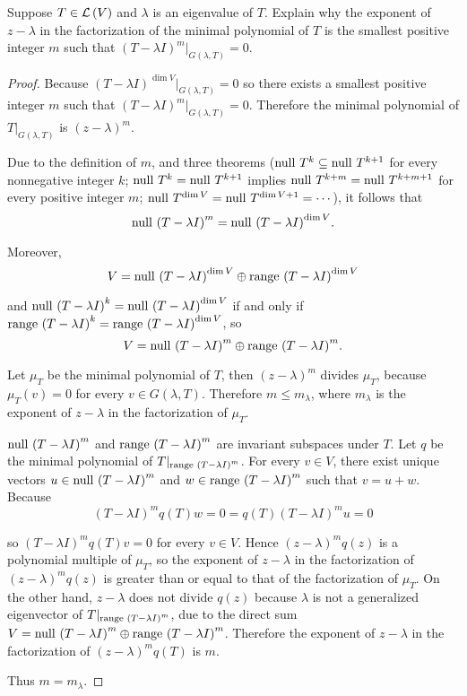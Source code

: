 \begin{exercise}\label{chapter8:sectionB:exercise6}
    Suppose $T \in \mathcal{L}\left({V}\right)$ and $\lambda$ is an eigenvalue of $T$. Explain why the exponent of $z - \lambda$ in the factorization of the minimal polynomial of $T$ is the smallest positive integer $m$ such that ${(T - \lambda I)}^{m}\vert_{G( \lambda, T)} = 0$.
\end{exercise}

\begin{proof}
    Because ${(T - \lambda I)}^{\dim V}\vert_{G(\lambda, T)} = 0$ so there exists a smallest positive integer $m$ such that ${(T - \lambda I)}^{m}\vert_{G(\lambda, T)} = 0$. Therefore the minimal polynomial of $T\vert_{G(\lambda, T)}$ is ${(z - \lambda)}^{m}$.

    Due to the definition of $m$, and three theorems ($\operatorname{null}\,{T^{k}}\subseteq \operatorname{null}\,{T^{k+1}}$ for every nonnegative integer $k$; $\operatorname{null}\,{T^{k}} = \operatorname{null}\,{T^{k+1}}$ implies $\operatorname{null}\,{T^{k+m}} = \operatorname{null}\,{T^{k+m+1}}$ for every positive integer $m$; $\operatorname{null}\,{T^{\dim V}} = \operatorname{null}\,{T^{\dim V + 1}} = \cdots$), it follows that
    \[
        \operatorname{null}\,{{(T - \lambda I)}^{m}} = \operatorname{null}\,{{(T - \lambda I)}^{\dim V}}.
    \]

    Moreover,
    \[
        V = \operatorname{null}\,{{(T - \lambda I)}^{\dim V}}\oplus\operatorname{range}\,{{(T - \lambda I)}^{\dim V}}
    \]

    and $\operatorname{null}\,{{(T - \lambda I)}^{k}} = \operatorname{null}\,{{(T - \lambda I)}^{\dim V}}$ if and only if $\operatorname{range}\,{{(T - \lambda I)}^{k}} = \operatorname{range}\,{{(T - \lambda I)}^{\dim V}}$, so
    \[
        V = \operatorname{null}\,{{(T - \lambda I)}^{m}}\oplus\operatorname{range}\,{{(T - \lambda I)}^{m}}.
    \]

    Let $\mu_{T}$ be the minimal polynomial of $T$, then ${(z - \lambda)}^{m}$ divides $\mu_{T}$, because $\mu_{T}(v) = 0$ for every $v\in G(\lambda, T)$. Therefore $m\leq m_{\lambda}$, where $m_{\lambda}$ is the exponent of ${z - \lambda}$ in the factorization of $\mu_{T}$.

    $\operatorname{null}\,{{(T - \lambda I)}^{m}}$ and $\operatorname{range}\,{{(T - \lambda I)}^{m}}$ are invariant subspaces under $T$. Let $q$ be the minimal polynomial of $T\vert_{\operatorname{range}\,{{(T - \lambda I)}^{m}}}$. For every $v\in V$, there exist unique vectors $u\in\operatorname{null}\,{{(T - \lambda I)}^{m}}$ and $w\in\operatorname{range}\,{{(T - \lambda I)}^{m}}$ such that $v = u + w$. Because
    \[
        {(T - \lambda I)}^{m}q(T)w = 0 = q(T){(T - \lambda I)}^{m}u = 0
    \]

    so ${(T - \lambda I)}^{m}q(T)v = 0$ for every $v\in V$. Hence ${(z - \lambda)}^{m}q(z)$ is a polynomial multiple of $\mu_{T}$, so the exponent of $z - \lambda$ in  the factorization of ${(z - \lambda)}^{m}q(z)$ is greater than or equal to that of the factorization of $\mu_{T}$. On the other hand, $z - \lambda$ does not divide $q(z)$ because $\lambda$ is not a generalized eigenvector of $T\vert_{\operatorname{range}\,{{(T - \lambda I)}^{m}}}$, due to the direct sum $V = \operatorname{null}\,{{(T - \lambda I)}^{m}}\oplus\operatorname{range}\,{{(T - \lambda I)}^{m}}$. Therefore the exponent of $z - \lambda$ in the factorization of ${(z - \lambda)}^{m}q(T)$ is $m$.

    Thus $m = m_{\lambda}$.
\end{proof}
\newpage

